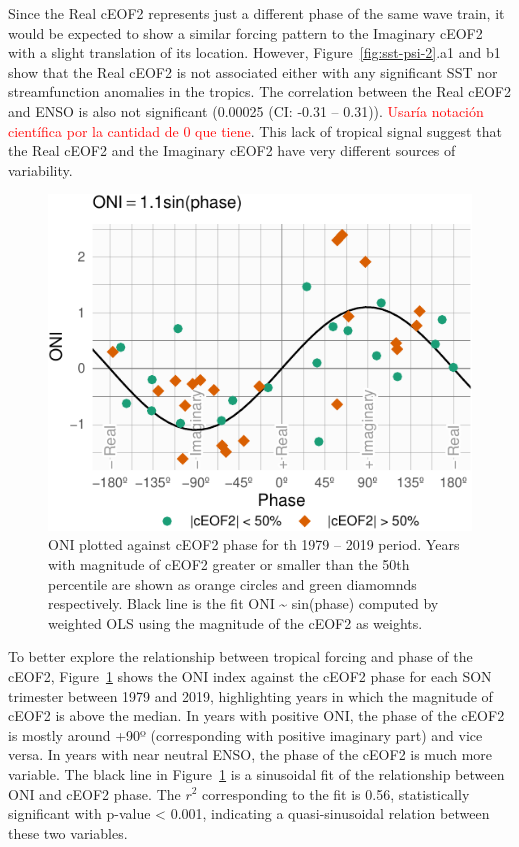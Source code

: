 \documentclass[smallextended]{svjour3}       %
\begin{document}
Since the Real cEOF2 represents just a different phase of the same wave train, it would be expected to show a similar forcing pattern to the Imaginary cEOF2 with a slight translation of its location.
However, Figure~\ref{fig:sst-psi-2}.a1 and b1 show that the Real cEOF2 is not associated either with any significant SST nor streamfunction anomalies in the tropics.
The correlation between the Real cEOF2 and ENSO is also not significant (0.00025 (CI: -0.31 -- 0.31)).
\textcolor{red}{Usaría notación científica por la cantidad de 0 que tiene}.
This lack of tropical signal suggest that the Real cEOF2 and the Imaginary cEOF2 have very different sources of variability.

\begin{figure}
\centering
\includegraphics{../figures/enso-phase-1.pdf}
\caption{\label{fig:enso-phase}ONI plotted against cEOF2 phase for th 1979 -- 2019 period. Years with magnitude of cEOF2 greater or smaller than the 50th percentile are shown as orange circles and green diamomnds respectively. Black line is the fit ONI \textasciitilde{} sin(phase) computed by weighted OLS using the magnitude of the cEOF2 as weights.}
\end{figure}

To better explore the relationship between tropical forcing and phase of the cEOF2, Figure~\ref{fig:enso-phase} shows the ONI index against the cEOF2 phase for each SON trimester between 1979 and 2019, highlighting years in which the magnitude of cEOF2 is above the median.
In years with positive ONI, the phase of the cEOF2 is mostly around +90º (corresponding with positive imaginary part) and vice versa.
In years with near neutral ENSO, the phase of the cEOF2 is much more variable.
The black line in Figure~\ref{fig:enso-phase} is a sinusoidal fit of the relationship between ONI and cEOF2 phase.
The \(r^2\) corresponding to the fit is 0.56, statistically significant with p-value \textless{} 0.001, indicating a quasi-sinusoidal relation between these two variables.
\end{document}
